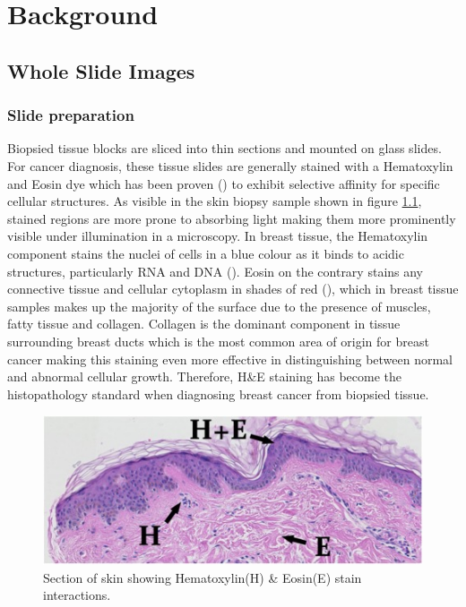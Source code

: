 \documentclass{l4proj}
\begin{document}
\chapter{Background}

\section{Whole Slide Images}\label{wsi-background}
\subsection{Slide preparation}
Biopsied tissue blocks are sliced into thin sections and mounted on glass slides. For cancer diagnosis, these tissue slides are generally stained with a Hematoxylin and Eosin dye which has been proven (\textit{\cite{Bancroft2013}}) to exhibit selective affinity for specific cellular structures. As visible in the skin biopsy sample shown in figure \ref{fig:HE-fig}, stained regions are more prone to absorbing light making them more prominently visible under illumination in a microscopy. In breast tissue, the Hematoxylin component stains the nuclei of cells in a blue colour as it binds to acidic structures, particularly RNA and DNA (\textit{\cite{chan2014wonderful}}). Eosin on the contrary stains any connective tissue and cellular cytoplasm in shades of red (\textit{\cite{Bancroft2013}}), which in breast tissue samples makes up the majority of the surface due to the presence of muscles, fatty tissue and collagen. Collagen is the dominant component in tissue surrounding breast ducts which is the most common area of origin for breast cancer making this staining even more effective in distinguishing between normal and abnormal cellular growth. Therefore, H\&E staining has become the histopathology standard when diagnosing breast cancer from biopsied tissue.

\begin{figure}[h]
\centering
\includegraphics[scale=1.2]{images/HE-stain-example.jpg}
\caption{Section of skin showing Hematoxylin(H) \& Eosin(E) stain interactions.}
\label{fig:HE-fig}
\end{figure}
\end{document}
